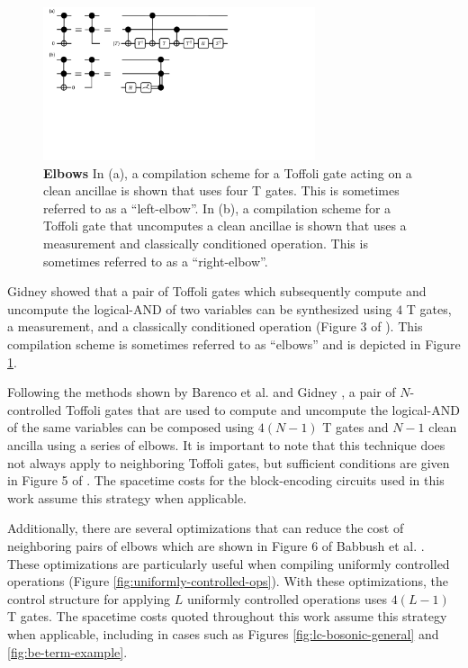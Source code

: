 \begin{figure}
    \includegraphics[width=8cm]{figures/elbows}
    \caption{
        \textbf{Elbows}
        In (a), a compilation scheme for a Toffoli gate acting on a clean ancillae is shown that uses four T gates.
        This is sometimes referred to as a ``left-elbow''.
        In (b), a compilation scheme for a Toffoli gate that uncomputes a clean ancillae is shown that uses a measurement and classically conditioned operation.
        This is sometimes referred to as a ``right-elbow''.
    }
    \label{fig:elbows}
\end{figure}

Gidney \cite{gidney2018halving} showed that a pair of Toffoli gates which subsequently compute and uncompute the logical-AND of two variables can be synthesized using $4$ T gates, a measurement, and a classically conditioned operation (Figure 3 of \cite{gidney2018halving}).
This compilation scheme is sometimes referred to as ``elbows'' and is depicted in Figure \ref{fig:elbows}.

Following the methods shown by Barenco et al. \cite{barenco1995elementary} and Gidney \cite{gidney2018halving}, a pair of $N$-controlled Toffoli gates that are used to compute and uncompute the logical-AND of the same variables can be composed using $4(N-1)$ T gates and $N-1$ clean ancilla using a series of elbows.
It is important to note that this technique does not always apply to neighboring Toffoli gates, but sufficient conditions are given in Figure 5 of \cite{gidney2018halving}.
The spacetime costs for the block-encoding circuits used in this work assume this strategy when applicable.

Additionally, there are several optimizations that can reduce the cost of neighboring pairs of elbows which are shown in Figure 6 of Babbush et al. \cite{babbush2018encoding}.
These optimizations are particularly useful when compiling uniformly controlled operations (Figure \ref{fig:uniformly-controlled-ops}).
With these optimizations, the control structure for applying $L$ uniformly controlled operations uses $4(L-1)$ T gates.
The spacetime costs quoted throughout this work assume this strategy when applicable, including in cases such as Figures \ref{fig:lc-bosonic-general} and \ref{fig:be-term-example}.


